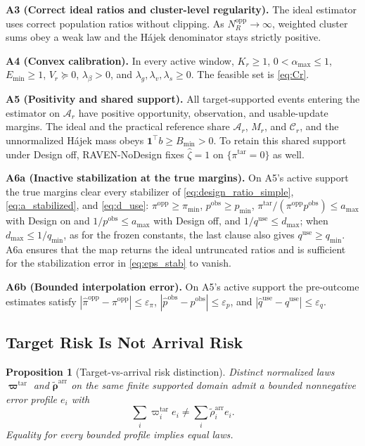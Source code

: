 \documentclass[letterpaper,journal]{IEEEtran}
\newtheorem{proposition}{Proposition}
\begin{document}
\noindent\textbf{A3 (Correct ideal ratios and cluster-level regularity).}
The ideal estimator uses correct population ratios without clipping.
As $N_R^{\mathrm{opp}}\rightarrow\infty$,
weighted cluster sums obey a weak law and the H\'ajek denominator stays
strictly positive.

\noindent\textbf{A4 (Convex calibration).}
In every active window, $K_r\ge1$, $0<\alpha_{\max}\le1$, $E_{\min}\ge1$,
$V_r\succeq0$, $\lambda_{\beta}>0$, and
$\lambda_g,\lambda_v,\lambda_s\ge0$.  The feasible set is \eqref{eq:Cr}.

\noindent\textbf{A5 (Positivity and shared support).}
All target-supported events entering the estimator on $\mathcal A_r$ have
positive opportunity, observation, and usable-update margins.  The ideal and
the practical reference share $\mathcal{A}_r$, $M_r$, and $\mathcal{C}_r$,
and the unnormalized H\'ajek mass obeys
$\mathbf{1}^{\top}b\ge B_{\min}>0$.  To retain this shared support under
Design off, RAVEN-NoDesign fixes $\widehat\zeta=1$ on
$\{\pi^{\mathrm{tar}}=0\}$ as well.

\noindent\textbf{A6a (Inactive stabilization at the true margins).}
On A5's active support the true margins clear every stabilizer of
\eqref{eq:design_ratio_simple}, \eqref{eq:a_stabilized}, and \eqref{eq:d_use}:
$\pi^{\mathrm{opp}}\ge\pi_{\min}$, $p^{\mathrm{obs}}\ge p_{\min}$,
$\pi^{\mathrm{tar}}/(\pi^{\mathrm{opp}}p^{\mathrm{obs}})\le a_{\max}$ with
Design on and $1/p^{\mathrm{obs}}\le a_{\max}$ with Design off, and
$1/q^{\mathrm{use}}\le d_{\max}$; when $d_{\max}\le1/q_{\min}$, as for the
frozen constants, the last clause also gives $q^{\mathrm{use}}\ge q_{\min}$.
A6a ensures that the map returns the ideal untruncated ratios and is sufficient
for the stabilization error in \eqref{eq:eps_stab} to vanish.

\noindent\textbf{A6b (Bounded interpolation error).}
On A5's active support the pre-outcome estimates satisfy
$|\widehat\pi^{\mathrm{opp}}-\pi^{\mathrm{opp}}|\le\varepsilon_\pi$,
$|\widehat p^{\mathrm{obs}}-p^{\mathrm{obs}}|\le\varepsilon_p$, and
$|\widehat q^{\mathrm{use}}-q^{\mathrm{use}}|\le\varepsilon_q$.

\subsection{Target Risk Is Not Arrival Risk}
\label{subsec:prop_risk}

\begin{proposition}[Target-vs-arrival risk distinction]
\label{prop:risk}
Distinct normalized laws $\boldsymbol\varpi^{\mathrm{tar}}$ and
$\widetilde{\boldsymbol\rho}^{\mathrm{arr}}$ on the same finite supported
domain admit a bounded nonnegative error profile $e_i$ with
\begin{equation}
 \sum_i
 \varpi_i^{\mathrm{tar}}e_i
 \neq
 \sum_i
 \widetilde\rho_i^{\mathrm{arr}}e_i.
 \label{eq:prop1_nonidentity}
\end{equation}
Equality for every bounded profile implies equal laws.
\end{proposition}
\end{document}
